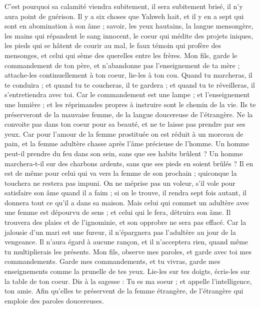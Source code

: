 \begin{multicols}{2}
C’est pourquoi sa calamité viendra subitement, il sera subitement brisé, il n’y aura point de guérison.
Il y a six choses que Yahweh hait, et il y en a sept qui sont en abomination à son âme ;
savoir, les yeux hautains, la langue mensongère, les mains qui répandent le sang innocent,
le coeur qui médite des projets iniques, les pieds qui se hâtent de courir au mal,
le faux témoin qui profère des mensonges, et celui qui sème des querelles entre les frères.
Mon fils, garde le commandement de ton père, et n'abandonne pas l'enseignement de ta mère ;
attache-les continuellement à ton coeur, lie-les à ton cou.
Quand tu marcheras, il te conduira ; et quand tu te coucheras, il te gardera ; et quand tu te réveilleras, il s'entretiendra avec toi.
Car le commandement est une lampe ; et l'enseignement une lumière ; et les réprimandes propres à instruire sont le chemin de la vie.
Ils te préserveront de la mauvaise femme, de la langue doucereuse de l’étrangère.
Ne la convoite pas dans ton coeur pour sa beauté, et ne te laisse pas prendre par ses yeux.
Car pour l’amour de la femme prostituée on est réduit à un morceau de pain, et la femme adultère chasse après l’âme précieuse de l’homme.
Un homme peut-il prendre du feu dans son sein, sans que ses habits brûlent ?
Un homme marchera-t-il sur des charbons ardents, sans que ses pieds en soient brûlés ?
Il en est de même pour celui qui va vers la femme de son prochain ; quiconque la touchera ne restera pas impuni.
On ne méprise pas un voleur, s'il vole pour satisfaire son âme quand il a faim ;
si on le trouve, il rendra sept fois autant, il donnera tout ce qu’il a dans sa maison.
Mais celui qui commet un adultère avec une femme est dépourvu de sens ; et celui qui le fera, détruira son âme.
Il trouvera des plaies et de l’ignominie, et son opprobre ne sera pas effacé.
Car la jalousie d’un mari est une fureur, il n'épargnera pas l'adultère au jour de la vengeance.
Il n'aura égard à aucune rançon, et il n'acceptera rien, quand même tu multiplierais les présents.
\TextTitle{[La prostituée]}
\VerseOne{}Mon fils, observe mes paroles, et garde avec toi mes commandements.
Garde mes commandements, et tu vivras, garde mes enseignements comme la prunelle de tes yeux.
Lie-les sur tes doigts, écris-les sur la table de ton coeur.
Dis à la sagesse : Tu es ma soeur ; et appelle l’intelligence, ton amie.
Afin qu'elles te préservent de la femme étrangère, de l’étrangère qui emploie des paroles doucereuses.

\end{multicols}
